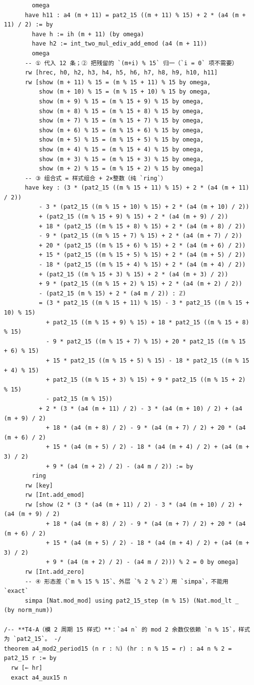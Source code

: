 \documentclass[11pt]{article}
\begin{document}
\begin{lstlisting}
        omega
      have h11 : a4 (m + 11) = pat2_15 ((m + 11) % 15) + 2 * (a4 (m + 11) / 2) := by
        have h := ih (m + 11) (by omega)
        have h2 := int_two_mul_ediv_add_emod (a4 (m + 11))
        omega
      -- ① 代入 12 条；② 把残留的 `(m+i) % 15` 归一（`i = 0` 项不需要）
      rw [hrec, h0, h2, h3, h4, h5, h6, h7, h8, h9, h10, h11]
      rw [show (m + 11) % 15 = (m % 15 + 11) % 15 by omega,
          show (m + 10) % 15 = (m % 15 + 10) % 15 by omega,
          show (m + 9) % 15 = (m % 15 + 9) % 15 by omega,
          show (m + 8) % 15 = (m % 15 + 8) % 15 by omega,
          show (m + 7) % 15 = (m % 15 + 7) % 15 by omega,
          show (m + 6) % 15 = (m % 15 + 6) % 15 by omega,
          show (m + 5) % 15 = (m % 15 + 5) % 15 by omega,
          show (m + 4) % 15 = (m % 15 + 4) % 15 by omega,
          show (m + 3) % 15 = (m % 15 + 3) % 15 by omega,
          show (m + 2) % 15 = (m % 15 + 2) % 15 by omega]
      -- ③ 组合式 = 样式组合 + 2×整数（纯 `ring`）
      have key : (3 * (pat2_15 ((m % 15 + 11) % 15) + 2 * (a4 (m + 11) / 2))
          - 3 * (pat2_15 ((m % 15 + 10) % 15) + 2 * (a4 (m + 10) / 2))
          + (pat2_15 ((m % 15 + 9) % 15) + 2 * (a4 (m + 9) / 2))
          + 18 * (pat2_15 ((m % 15 + 8) % 15) + 2 * (a4 (m + 8) / 2))
          - 9 * (pat2_15 ((m % 15 + 7) % 15) + 2 * (a4 (m + 7) / 2))
          + 20 * (pat2_15 ((m % 15 + 6) % 15) + 2 * (a4 (m + 6) / 2))
          + 15 * (pat2_15 ((m % 15 + 5) % 15) + 2 * (a4 (m + 5) / 2))
          - 18 * (pat2_15 ((m % 15 + 4) % 15) + 2 * (a4 (m + 4) / 2))
          + (pat2_15 ((m % 15 + 3) % 15) + 2 * (a4 (m + 3) / 2))
          + 9 * (pat2_15 ((m % 15 + 2) % 15) + 2 * (a4 (m + 2) / 2))
          - (pat2_15 (m % 15) + 2 * (a4 m / 2)) : ℤ)
          = (3 * pat2_15 ((m % 15 + 11) % 15) - 3 * pat2_15 ((m % 15 + 10) % 15)
            + pat2_15 ((m % 15 + 9) % 15) + 18 * pat2_15 ((m % 15 + 8) % 15)
            - 9 * pat2_15 ((m % 15 + 7) % 15) + 20 * pat2_15 ((m % 15 + 6) % 15)
            + 15 * pat2_15 ((m % 15 + 5) % 15) - 18 * pat2_15 ((m % 15 + 4) % 15)
            + pat2_15 ((m % 15 + 3) % 15) + 9 * pat2_15 ((m % 15 + 2) % 15)
            - pat2_15 (m % 15))
          + 2 * (3 * (a4 (m + 11) / 2) - 3 * (a4 (m + 10) / 2) + (a4 (m + 9) / 2)
            + 18 * (a4 (m + 8) / 2) - 9 * (a4 (m + 7) / 2) + 20 * (a4 (m + 6) / 2)
            + 15 * (a4 (m + 5) / 2) - 18 * (a4 (m + 4) / 2) + (a4 (m + 3) / 2)
            + 9 * (a4 (m + 2) / 2) - (a4 m / 2)) := by
        ring
      rw [key]
      rw [Int.add_emod]
      rw [show (2 * (3 * (a4 (m + 11) / 2) - 3 * (a4 (m + 10) / 2) + (a4 (m + 9) / 2)
            + 18 * (a4 (m + 8) / 2) - 9 * (a4 (m + 7) / 2) + 20 * (a4 (m + 6) / 2)
            + 15 * (a4 (m + 5) / 2) - 18 * (a4 (m + 4) / 2) + (a4 (m + 3) / 2)
            + 9 * (a4 (m + 2) / 2) - (a4 m / 2))) % 2 = 0 by omega]
      rw [Int.add_zero]
      -- ④ 形态差（`m % 15 % 15`、外层 `% 2 % 2`）用 `simpa`，不能用 `exact`
      simpa [Nat.mod_mod] using pat2_15_step (m % 15) (Nat.mod_lt _ (by norm_num))

/-- **T4-A（模 2 周期 15 样式）**：`a4 n` 的 mod 2 余数仅依赖 `n % 15`，样式为 `pat2_15`。 -/
theorem a4_mod2_period15 (n r : ℕ) (hr : n % 15 = r) : a4 n % 2 = pat2_15 r := by
  rw [← hr]
  exact a4_aux15 n
\end{lstlisting}
\end{document}

